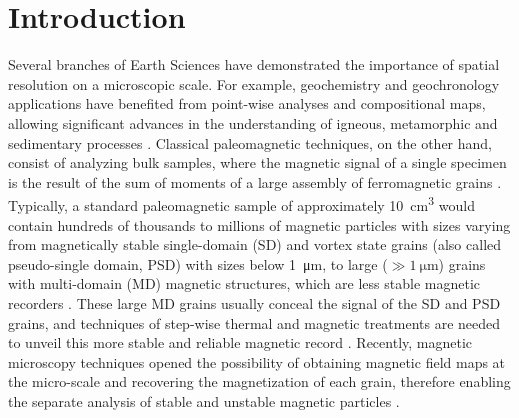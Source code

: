 \section{Introduction}

Several branches of Earth Sciences have demonstrated the importance of spatial resolution on a microscopic scale. For example, geochemistry and
geochronology applications have benefited from point-wise analyses
and compositional maps, allowing significant advances in the understanding of
igneous, metamorphic and sedimentary processes \citep{Verberne2020, Barnes2019,
Davidson2007}. Classical paleomagnetic techniques, on the other hand, consist
of analyzing bulk samples, where the magnetic signal of a single specimen is
the result of the sum of moments of a large assembly of ferromagnetic grains
\citep{Dunlop1997}. Typically, a standard paleomagnetic sample of
approximately \qty{10}{\cm\cubed} would contain hundreds of thousands
to millions of magnetic particles with sizes varying from magnetically stable
single-domain (SD) and vortex state grains (also called pseudo-single domain,
PSD) with sizes below \qty{1}{\um}, to large ($\gg \qty{1}{\um}$) grains with
multi-domain (MD) magnetic structures, which are less stable magnetic recorders
\citep{Berndt2016}. These large MD grains usually conceal the signal of the SD
and PSD grains, and techniques of step-wise thermal and magnetic treatments are
needed to unveil this more stable and reliable magnetic record
\citep{Tauxe2018}. Recently, magnetic microscopy techniques opened the
possibility of obtaining magnetic field maps at the micro-scale and recovering the
magnetization of each grain, therefore enabling the separate analysis of stable
and unstable magnetic particles \citep{DeGroot2018, Lima2014, Weiss2007,
DeGroot2014}.

